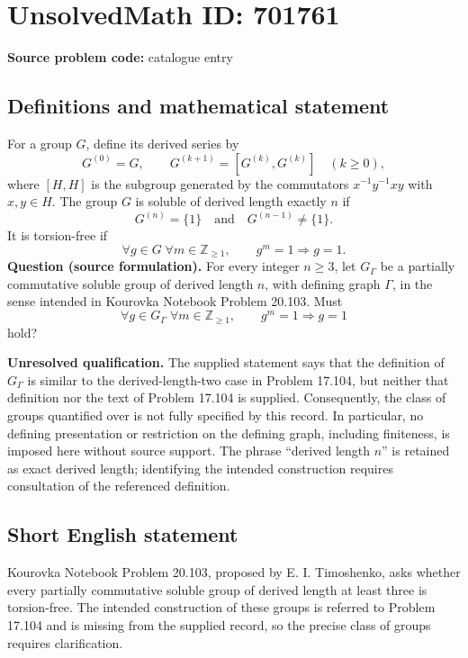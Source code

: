 \documentclass[11pt]{article}
\newcommand{\Z}{\mathbb{Z}}
\begin{document}
\section*{UnsolvedMath ID: 701761}
\textbf{Source problem code:} catalogue entry
\subsection{Definitions and mathematical statement}
For a group \(G\), define its derived series by
\[
G^{(0)}=G,\qquad G^{(k+1)}=[G^{(k)},G^{(k)}]\quad(k\geq 0),
\]
where \([H,H]\) is the subgroup generated by the commutators \(x^{-1}y^{-1}xy\) with \(x,y\in H\). The group \(G\) is soluble of derived length exactly \(n\) if
\[
G^{(n)}=\{1\}\quad\text{and}\quad G^{(n-1)}\neq\{1\}.
\]
It is torsion-free if
\[
\forall g\in G\;\forall m\in\Z_{\geq 1},\qquad g^m=1\Longrightarrow g=1.
\]
\textbf{Question (source formulation).} For every integer \(n\geq 3\), let \(G_\Gamma\) be a partially commutative soluble group of derived length \(n\), with defining graph \(\Gamma\), in the sense intended in Kourovka Notebook Problem 20.103. Must
\[
\forall g\in G_\Gamma\;\forall m\in\Z_{\geq 1},\qquad g^m=1\Longrightarrow g=1
\]
hold?

\textbf{Unresolved qualification.} The supplied statement says that the definition of \(G_\Gamma\) is similar to the derived-length-two case in Problem 17.104, but neither that definition nor the text of Problem 17.104 is supplied. Consequently, the class of groups quantified over is not fully specified by this record. In particular, no defining presentation or restriction on the defining graph, including finiteness, is imposed here without source support. The phrase ``derived length \(n\)'' is retained as exact derived length; identifying the intended construction requires consultation of the referenced definition.
\subsection{Short English statement}
Kourovka Notebook Problem 20.103, proposed by E. I. Timoshenko, asks whether every partially commutative soluble group of derived length at least three is torsion-free. The intended construction of these groups is referred to Problem 17.104 and is missing from the supplied record, so the precise class of groups requires clarification.
\end{document}
